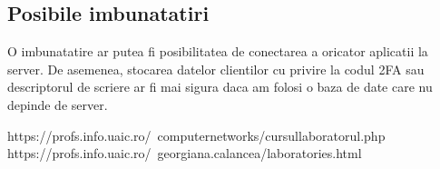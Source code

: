 \documentclass[runningheads]{llncs}
\begin{document}
\subsection{Posibile imbunatatiri}
\hspace{10pt} O imbunatatire ar putea fi posibilitatea de conectarea a oricator aplicatii la server. De asemenea, stocarea datelor clientilor cu privire la codul 2FA sau descriptorul de scriere ar fi mai sigura daca am folosi o baza de date care nu depinde de server.

\renewcommand\refname{Bibliografie}
\begin{thebibliography}{8}
https://profs.info.uaic.ro/~computernetworks/cursullaboratorul.php
https://profs.info.uaic.ro/~georgiana.calancea/laboratories.html 
\end{thebibliography}
\end{document}
